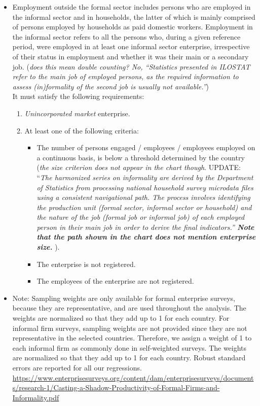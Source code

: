 \documentclass[letterpaper, 12pt]{article}
\begin{document}
\begin{itemize}
    \item Employment outside the formal sector includes persons who are employed in the informal sector and in households, the latter of which is mainly comprised of persons employed by households as paid domestic workers. Employment in the informal sector refers to all the persons who, during a given reference period, were employed in at least one informal sector enterprise, irrespective of their status in employment and whether it was their main or a secondary job. (\textit{does this mean double counting? No, ``Statistics presented in ILOSTAT refer to the main job of employed persons, as the required information to assess (in)formality of the second job is usually not available.''})
    \\It must satisfy the following requirements:
    \begin{enumerate}
        \item \textit{Unincorporated market} enterprise.
        \item At least one of the following criteria:
        \begin{itemize}
            \item The number of persons engaged / employees / employees employed on a continuous basis, is below a threshold determined by the country (\textit{the size criterion does not appear in the chart though}. UPDATE: ``\textit{The harmonized series on informality are derived by the Department of Statistics from processing national household survey microdata files using a consistent navigational path. The process involves identifying the production unit (formal sector, informal sector or household) and the nature of the job (formal job or informal job) of each employed person in their main job in order to derive the final indicators.'' \textbf{Note that the path shown in the chart does not mention enterprise size.}} ).
            \item The enterprise is not registered.
            \item The employees of the enterprise are not registered.            
        \end{itemize}
    \end{enumerate}
    \noindent
    
    \item Note: Sampling weights are only available for formal enterprise surveys, because they are
    representative, and are used throughout the analysis. The weights are normalized so that they add
    up to 1 for each country. For informal firm surveys, sampling weights are not provided since they
    are not representative in the selected countries. Therefore, we assign a weight of 1 to each informal
    firm as commonly done in self-weighted surveys. The weights are normalized so that they add up
    to 1 for each country. Robust standard errors are reported for all our regressions.
    \href{https://www.enterprisesurveys.org/content/dam/enterprisesurveys/documents/research-1/Casting-a-Shadow-Productivity-of-Formal-Firms-and-Informality.pdf}{https://www.enterprisesurveys.org/content/dam/enterprisesurveys/documents/research-1/Casting-a-Shadow-Productivity-of-Formal-Firms-and-Informality.pdf}
    

\end{itemize}
\end{document}
